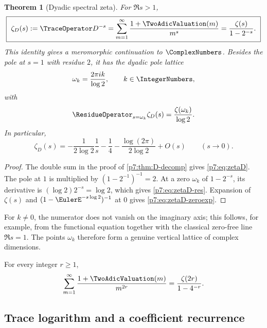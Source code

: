 \documentclass[11pt]{article}
\numberwithin{equation}{section}
\newtheorem{theorem}{Theorem}[section]
\theoremstyle{definition}
\theoremstyle{remark}
\begin{document}
\begin{theorem}[Dyadic spectral zeta]\label{p7:thm:zetaD}
For $\Re s>1$,
\begin{equation}\label{p7:eq:zetaD}
 \boxed{\ \zeta_D(s):=\TraceOperator D^{-s}
 =\sum_{m=1}^{\infty}\frac{1+\TwoAdicValuation(m)}{m^s}
 =\frac{\zeta(s)}{1-2^{-s}}.\ }
\end{equation}
This identity gives a meromorphic continuation to $\ComplexNumbers$.  Besides the pole at $s=1$ with residue $2$, it has the dyadic pole lattice
\begin{equation}\label{p7:eq:omega}
 \omega_k=\frac{2\pi i k}{\log2},\qquad k\in\IntegerNumbers,
\end{equation}
with
\begin{equation}\label{p7:eq:zetaD-res}
 \ResidueOperator_{s=\omega_k}\zeta_D(s)=\frac{\zeta(\omega_k)}{\log2}.
\end{equation}
In particular,
\begin{equation}\label{p7:eq:zetaD-zeroexp}
 \zeta_D(s)=-\frac{1}{2\log2}\frac1s
 -\frac14-\frac{\log(2\pi)}{2\log2}+O(s)
 \qquad(s\to0).
\end{equation}
\end{theorem}

\begin{proof}
The double sum in the proof of \cref{p7:thm:D-decomp} gives \cref{p7:eq:zetaD}.  The pole at $1$ is multiplied by $(1-2^{-1})^{-1}=2$.  At a zero $\omega_k$ of $1-2^{-s}$, its derivative is $(\log2)2^{-s}=\log2$, which gives \cref{p7:eq:zetaD-res}.  Expansion of $\zeta(s)$ and $(1-\EulerE^{-s\log2})^{-1}$ at $0$ gives \cref{p7:eq:zetaD-zeroexp}.
\end{proof}

For $k\ne0$, the numerator does not vanish on the imaginary axis; this follows, for example, from the functional equation together with the classical zero-free line $\Re s=1$.  The points $\omega_k$ therefore form a genuine vertical lattice of complex dimensions.

\begin{corollary}\label{p7:cor:zero-powers}
For every integer $r\ge1$,
\begin{equation}\label{p7:eq:zero-powers}
 \sum_{m=1}^{\infty}\frac{1+\TwoAdicValuation(m)}{m^{2r}}
 =\frac{\zeta(2r)}{1-4^{-r}}.
\end{equation}
\end{corollary}

\subsection{Trace logarithm and a coefficient recurrence}
\end{document}
